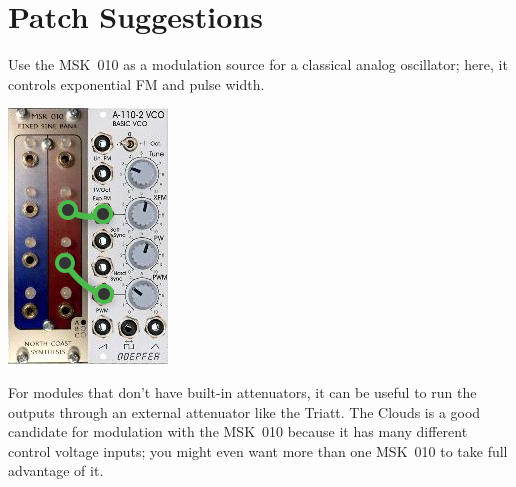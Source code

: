 
%
%
%
%
%
%

\chapter{Patch Suggestions}

Use the MSK~010 as a modulation source for a classical analog oscillator;
here, it controls exponential FM and pulse width.

{\hspace*{\fill}\includegraphics[scale=0.8]{patch1.png}\hspace*{\fill}\par} 

For modules that don't have built-in attenuators, it can be useful to run
the outputs through an external attenuator like the Triatt.  The Clouds is a
good candidate for modulation with the MSK~010 because it has many different
control voltage inputs; you might even want more than one MSK~010 to take
full advantage of it.


